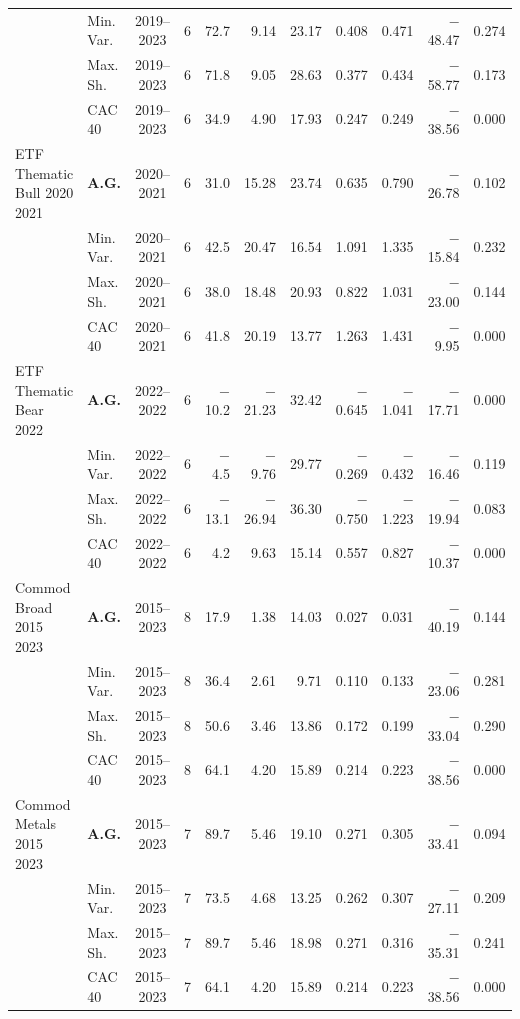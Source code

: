 \begin{longtable}{p{2.6cm} l c c r r r r r r r}
 & Min.\,Var. & 2019--2023 & 6 & 72.7 & 9.14 & 23.17 & 0.408 & 0.471 & $-$48.47 & 0.274 \\
 & Max.\,Sh. & 2019--2023 & 6 & 71.8 & 9.05 & 28.63 & 0.377 & 0.434 & $-$58.77 & 0.173 \\
 & CAC 40 & 2019--2023 & 6 & 34.9 & 4.90 & 17.93 & 0.247 & 0.249 & $-$38.56 & 0.000 \\
\midrule
ETF Thematic Bull 2020 2021 & \textbf{A.G.} & 2020--2021 & 6 & 31.0 & 15.28 & 23.74 & 0.635 & 0.790 & $-$26.78 & 0.102 \\
 & Min.\,Var. & 2020--2021 & 6 & 42.5 & 20.47 & 16.54 & 1.091 & 1.335 & $-$15.84 & 0.232 \\
 & Max.\,Sh. & 2020--2021 & 6 & 38.0 & 18.48 & 20.93 & 0.822 & 1.031 & $-$23.00 & 0.144 \\
 & CAC 40 & 2020--2021 & 6 & 41.8 & 20.19 & 13.77 & 1.263 & 1.431 & $-$9.95 & 0.000 \\
\midrule
ETF Thematic Bear 2022 & \textbf{A.G.} & 2022--2022 & 6 & $-$10.2 & $-$21.23 & 32.42 & $-$0.645 & $-$1.041 & $-$17.71 & 0.000 \\
 & Min.\,Var. & 2022--2022 & 6 & $-$4.5 & $-$9.76 & 29.77 & $-$0.269 & $-$0.432 & $-$16.46 & 0.119 \\
 & Max.\,Sh. & 2022--2022 & 6 & $-$13.1 & $-$26.94 & 36.30 & $-$0.750 & $-$1.223 & $-$19.94 & 0.083 \\
 & CAC 40 & 2022--2022 & 6 & 4.2 & 9.63 & 15.14 & 0.557 & 0.827 & $-$10.37 & 0.000 \\
\midrule
Commod Broad 2015 2023 & \textbf{A.G.} & 2015--2023 & 8 & 17.9 & 1.38 & 14.03 & 0.027 & 0.031 & $-$40.19 & 0.144 \\
 & Min.\,Var. & 2015--2023 & 8 & 36.4 & 2.61 & 9.71 & 0.110 & 0.133 & $-$23.06 & 0.281 \\
 & Max.\,Sh. & 2015--2023 & 8 & 50.6 & 3.46 & 13.86 & 0.172 & 0.199 & $-$33.04 & 0.290 \\
 & CAC 40 & 2015--2023 & 8 & 64.1 & 4.20 & 15.89 & 0.214 & 0.223 & $-$38.56 & 0.000 \\
\midrule
Commod Metals 2015 2023 & \textbf{A.G.} & 2015--2023 & 7 & 89.7 & 5.46 & 19.10 & 0.271 & 0.305 & $-$33.41 & 0.094 \\
 & Min.\,Var. & 2015--2023 & 7 & 73.5 & 4.68 & 13.25 & 0.262 & 0.307 & $-$27.11 & 0.209 \\
 & Max.\,Sh. & 2015--2023 & 7 & 89.7 & 5.46 & 18.98 & 0.271 & 0.316 & $-$35.31 & 0.241 \\
 & CAC 40 & 2015--2023 & 7 & 64.1 & 4.20 & 15.89 & 0.214 & 0.223 & $-$38.56 & 0.000 \\

\end{longtable}
